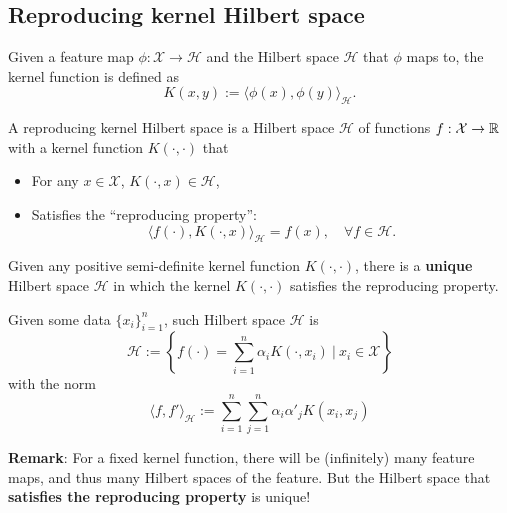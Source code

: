 \subsection{Reproducing kernel Hilbert space}
\begin{definition}
Given a feature map $\phi: \mathcal{X} \rightarrow \mathcal{H}$ and the Hilbert space $\mathcal{H}$ that $\phi$ maps to, the kernel function is defined as $$ K(x, y) := \langle \phi(x), \phi(y) \rangle_\mathcal{H}.
$$
\end{definition}

\begin{definition} A reproducing kernel Hilbert space is a Hilbert space $\mathcal{H}$ of functions $f: \mathcal{X} \rightarrow \mathbb{R}$  with a kernel function $K(\cdot, \cdot)$ that
\begin{itemize}
    \item For any $x \in \mathcal{X}$, $K(\cdot, x) \in \mathcal{H}$,
    \item Satisfies the ``reproducing property'':$$
    \langle f(\cdot), K(\cdot, x) \rangle_\mathcal{H} = f(x), \quad \forall f \in \mathcal{H}.
$$
\end{itemize}
\end{definition}

\begin{theorem}
Given any positive semi-definite kernel function $K(\cdot, \cdot)$, there is a \textbf{unique} Hilbert space $\mathcal{H}$ in which the kernel $K(\cdot, \cdot)$ satisfies the reproducing property. 

Given some data $\{x_i\}_{i=1}^n $, such Hilbert space $\mathcal{H}$ is 
$$
\mathcal{H} := \left\{ f(\cdot) = \sum_{i=1}^n \alpha_i K(\cdot, x_i)\ \bigg|\ x_i \in \mathcal{X} \right\}$$
with the norm
$$
\langle f, f' \rangle_\mathcal{H} := \sum_{i=1}^n  \sum_{j=1}^n \alpha_i \alpha'_j K(x_i, x_j)  
$$
\end{theorem}
\textbf{Remark}: For a fixed kernel function, there will be (infinitely) many feature maps, and thus many Hilbert spaces of the feature. But the Hilbert space that \textbf{satisfies the reproducing property} is unique!

